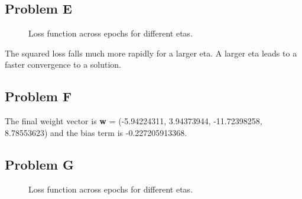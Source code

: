 \documentclass[12pt]{article} %
\begin{document}
\subsection{Problem E}

\begin{figure}[H]
	\caption{Loss function across epochs for different etas.}
\end{figure}

The squared loss falls much more rapidly for a larger eta. A larger eta leads to a faster convergence to a solution.

\subsection{Problem F}
The final weight vector is \textbf{w} = (-5.94224311, 3.94373944, -11.72398258, 8.78553623) and the bias term is -0.227205913368.

\subsection{Problem G}
\begin{figure}[H]
	\caption{Loss function across epochs for different etas.}
\end{figure}
\end{document}
